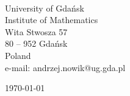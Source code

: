 
\begin{center}
 \\
University of Gda\'nsk \\
Institute of Mathematics \\
Wita Stwosza 57 \\
80 -- 952 Gda\'nsk \\
Poland\\
e-mail: andrzej.nowik@ug.gda.pl
\end{center}

\begin{center}
\today
\end{center}




\documentclass[b5cutpaper, twoside, 11pt, leqno]{moravica}
\usepackage{amsmath}
\usepackage{amsthm}
\usepackage{amsfonts}
\usepackage{amssymb}
\usepackage{graphicx}
\usepackage[left=1.95cm, top=1.75cm, bottom=1.75cm, right=1.95cm, nofoot]{geometry}
\usepackage[T1]{fontenc}
\usepackage{gensymb}

\allowdisplaybreaks

\usepackage[absolute]{textpos}

\usepackage{fancyhdr}
\pagestyle{fancy}
\fancyhead[RO,RE,LO,LE, CO, CE]{}
\fancyfoot{}

\fancyhead[RO]{\footnotesize{\thepage}}
\fancyhead[LE]{\footnotesize{\thepage}}
\fancyhead[CE]{\footnotesize\textsc{\rightmark}}
\fancyhead[CO]{\footnotesize\textsc{\leftmark}}
\fancyfoot{}
\renewcommand{\headrulewidth}{0.5pt}
\renewcommand{\footrulewidth}{0pt}
\footskip=0cm
\headheight=15pt

\newlength{\alength}
\setlength{\alength}{10cm}

